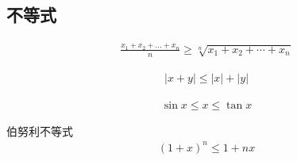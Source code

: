 \begin{center}\section{ 不等式}\end{center}

\begin{align}
\frac{x_1+x_2+\dots+x_n}{n}\geqslant \sqrt[n]{x_1+x_2+\cdots+x_n}
\end{align}

\begin{align}
|x+y|\leqslant|x|+|y|
\end{align}

\begin{align}
\sin x \leqslant x \leqslant \tan x
\end{align}

伯努利不等式
\begin{align}
(1+x)^n\leqslant 1+nx
\end{align}
